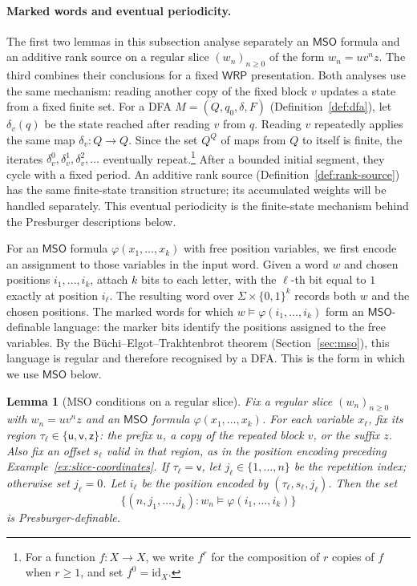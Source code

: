 \documentclass[11pt]{article}
\newtheorem{lemma}[theorem]{Lemma}
\theoremstyle{definition}
\newcommand{\WRP}{\mathsf{WRP}}
\newcommand{\MSO}{\mathsf{MSO}}
\begin{document}
\paragraph{Marked words and eventual periodicity.}
The first two lemmas in this subsection analyse separately an $\MSO$ formula
and an additive rank source on a regular slice $(w_n)_{n\ge0}$ of the form
$w_n=uv^nz$.  The third
combines their conclusions for a fixed $\WRP$ presentation.  Both analyses use
the same mechanism: reading another copy of the fixed block $v$ updates a state
from a fixed finite set.  For a DFA
$M=(Q,q_0,\delta,F)$ (Definition~\ref{def:dfa}), let $\delta_v(q)$ be the state
reached after reading $v$ from $q$.  Reading $v$ repeatedly applies the same map
$\delta_v\colon Q\to Q$.  Since the set $Q^Q$ of maps from $Q$ to itself is
finite, the iterates $\delta_v^0,\delta_v^1,\delta_v^2,\ldots$ eventually
repeat.\footnote{For a function $f\colon X\to X$, we write $f^r$ for the
composition of $r$ copies of $f$ when $r\ge 1$, and set
$f^0=\mathrm{id}_X$.}  After a bounded initial segment, they cycle with a fixed
period.  An additive
rank source (Definition~\ref{def:rank-source}) has the same finite-state
transition structure; its accumulated weights will be handled separately.
This eventual periodicity is the finite-state mechanism behind the Presburger
descriptions below.

For an $\MSO$ formula $\varphi(x_1,\ldots,x_k)$ with free position variables,
we first encode an assignment to those variables in the input word.  Given a
word $w$ and chosen positions $i_1,\ldots,i_k$, attach $k$ bits to each letter,
with the $\ell$-th bit equal to $1$ exactly at position $i_\ell$.  The resulting
word over $\Sigma\times\{0,1\}^k$ records both $w$ and the chosen positions.  The
marked words for which $w\models\varphi(i_1,\ldots,i_k)$ form an
$\MSO$-definable language: the marker bits identify the positions assigned to
the free variables.  By the B\"uchi--Elgot--Trakhtenbrot theorem
(Section~\ref{sec:mso}), this language is regular and therefore recognised by a
DFA.  This is the form in which we use $\MSO$ below.

\begin{lemma}[MSO conditions on a regular slice]
\label{lem:one-loop-finite-state}
Fix a regular slice $(w_n)_{n\ge0}$ with $w_n=uv^nz$ and an $\MSO$ formula
$\varphi(x_1,\ldots,x_k)$.  For each variable $x_\ell$, fix its region
$\tau_\ell\in\{\mathsf u,\mathsf v,\mathsf z\}$: the prefix $u$, a copy of the
repeated block $v$, or the suffix $z$.  Also fix an offset $s_\ell$ valid in
that region, as in the position encoding preceding
Example~\ref{ex:slice-coordinates}.  If $\tau_\ell=\mathsf v$, let
$j_\ell\in\{1,\ldots,n\}$ be the repetition index; otherwise set $j_\ell=0$.
Let $i_\ell$ be the position encoded by $(\tau_\ell,s_\ell,j_\ell)$.  Then the
set
\[
   \{(n,j_1,\ldots,j_k):
      w_n\models\varphi(i_1,\ldots,i_k)\}
\]
is Presburger-definable.
\end{lemma}
\end{document}
